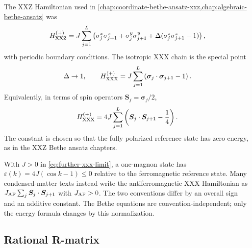 The XXZ Hamiltonian used in \cref{chap:coordinate-bethe-ansatz-xxz,chap:algebraic-bethe-ansatz}
was
\begin{equation}
\label{eq:further-xxz-hamiltonian-recall}
    H_{\rm XXZ}^{(+)}
    =
    J\sum_{j=1}^{L}
    \left(
        \sigma_j^x\sigma_{j+1}^x
        +\sigma_j^y\sigma_{j+1}^y
        +\Delta(\sigma_j^z\sigma_{j+1}^z-1)
    \right),
\end{equation}
with periodic boundary conditions.  The isotropic XXX chain is the special point
\begin{equation}
\label{eq:further-xxx-limit}
    \Delta\to1,
    \qquad
    H_{\rm XXX}^{(+)}
    =
    J\sum_{j=1}^{L}
    \left(
        \bm{\sigma}_j\cdot\bm{\sigma}_{j+1}-1
    \right).
\end{equation}
Equivalently, in terms of spin operators $\bm{S}_j=\bm{\sigma}_j/2$,
\begin{equation}
\label{eq:further-xxx-spin-form}
    H_{\rm XXX}^{(+)}
    =
    4J\sum_{j=1}^{L}
    \left(
        \bm{S}_j\cdot\bm{S}_{j+1}-\frac14
    \right).
\end{equation}
The constant is chosen so that the fully polarized reference state has zero
energy, as in the XXZ Bethe ansatz chapters.

\begin{remark}
With $J>0$ in \cref{eq:further-xxx-limit}, a one-magnon state has
$\varepsilon(k)=4J(\cos k-1)\leq0$ relative to the ferromagnetic reference
state.  Many condensed-matter texts instead write the antiferromagnetic XXX
Hamiltonian as
$J_{\rm AF}\sum_j\bm{S}_j\cdot\bm{S}_{j+1}$ with $J_{\rm AF}>0$.
The two conventions differ by an overall sign and an additive constant.  The
Bethe equations are convention-independent; only the energy formula changes by
this normalization.
\end{remark}

\subsection{Rational R-matrix}
\label{subsec:further-rational-r-matrix}

